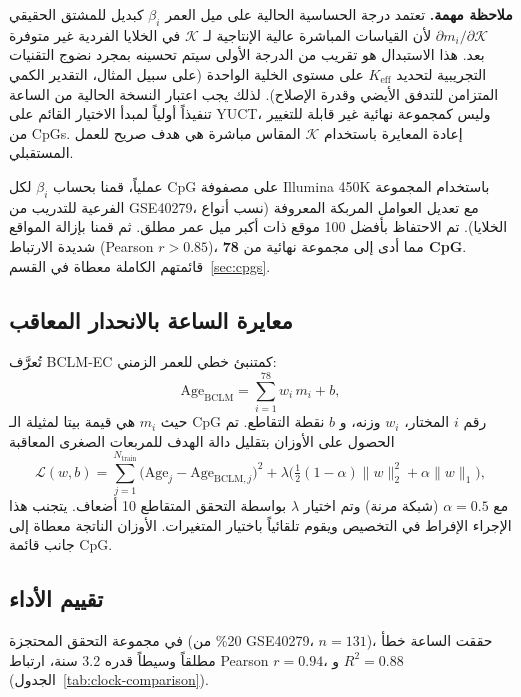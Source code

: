 \documentclass[11pt,a4paper]{article}
\newcommand{\REL}{\mathcal{K}}          %
\begin{document}
	\textbf{ملاحظة مهمة.}
	تعتمد درجة الحساسية الحالية على ميل العمر \(\beta_i\) كبديل للمشتق الحقيقي \(\partial m_i/\partial \REL\) لأن القياسات المباشرة عالية الإنتاجية لـ \(\REL\) في الخلايا الفردية غير متوفرة بعد.
	هذا الاستبدال هو تقريب من الدرجة الأولى سيتم تحسينه بمجرد نضوج التقنيات التجريبية لتحديد \(K_{\mathrm{eff}}\) على مستوى الخلية الواحدة (على سبيل المثال، التقدير الكمي المتزامن للتدفق الأيضي وقدرة الإصلاح).
	لذلك يجب اعتبار النسخة الحالية من الساعة تنفيذاً أولياً لمبدأ الاختيار القائم على YUCT، وليس كمجموعة نهائية غير قابلة للتغيير من CpGs. إعادة المعايرة باستخدام \(\REL\) المقاس مباشرة هي هدف صريح للعمل المستقبلي.
	
	عملياً، قمنا بحساب \(\beta_i\) لكل CpG على مصفوفة Illumina 450K باستخدام المجموعة الفرعية للتدريب من GSE40279، مع تعديل العوامل المربكة المعروفة (نسب أنواع الخلايا). تم الاحتفاظ بأفضل 100 موقع ذات أكبر ميل عمر مطلق. ثم قمنا بإزالة المواقع شديدة الارتباط (Pearson \(r > 0.85\))، مما أدى إلى مجموعة نهائية من \textbf{78 CpG}. قائمتهم الكاملة معطاة في القسم~\ref{sec:cpgs}.
	
	\subsection{معايرة الساعة بالانحدار المعاقب}
	تُعرَّف BCLM-EC كمتنبئ خطي للعمر الزمني:
	\begin{equation}
		\mathrm{Age}_{\mathrm{BCLM}} = \sum_{i=1}^{78} w_i \, m_i + b,
		\label{eq:clock}
	\end{equation}
	حيث \(m_i\) هي قيمة بيتا لمثيلة الـ CpG رقم \(i\) المختار، \(w_i\) وزنه، و \(b\) نقطة التقاطع. تم الحصول على الأوزان بتقليل دالة الهدف للمربعات الصغرى المعاقبة
	\[
	\mathcal{L}(w,b) = \sum_{j=1}^{N_{\mathrm{train}}} \bigl( \mathrm{Age}_j - \mathrm{Age}_{\mathrm{BCLM},j} \bigr)^2 + \lambda \bigl( \tfrac{1}{2}(1-\alpha)\|w\|_2^2 + \alpha\|w\|_1 \bigr),
	\]
	مع \(\alpha=0.5\) (شبكة مرنة) وتم اختيار \(\lambda\) بواسطة التحقق المتقاطع 10 أضعاف. يتجنب هذا الإجراء الإفراط في التخصيص ويقوم تلقائياً باختيار المتغيرات. الأوزان الناتجة معطاة إلى جانب قائمة CpG.
	
	\subsection{تقييم الأداء}
	في مجموعة التحقق المحتجزة (20\% من GSE40279، \(n=131\))، حققت الساعة خطأ مطلقاً وسيطاً قدره 3.2 سنة، ارتباط Pearson \(r=0.94\)، و \(R^2=0.88\) (الجدول~\ref{tab:clock-comparison}).
	
\end{document}
